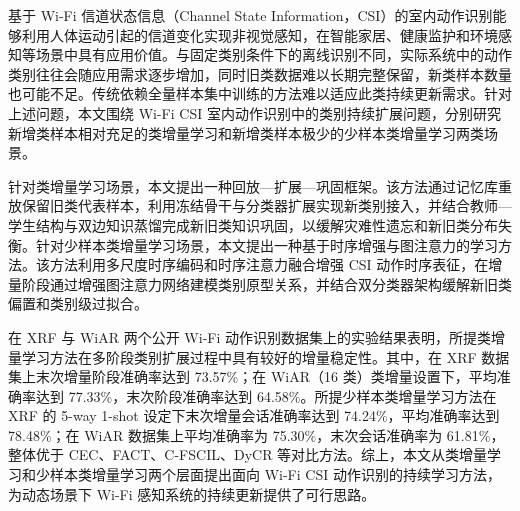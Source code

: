 
\begin{chineseabstract}

基于 Wi-Fi 信道状态信息（Channel State Information，CSI）的室内动作识别能够利用人体运动引起的信道变化实现非视觉感知，在智能家居、健康监护和环境感知等场景中具有应用价值。与固定类别条件下的离线识别不同，实际系统中的动作类别往往会随应用需求逐步增加，同时旧类数据难以长期完整保留，新类样本数量也可能不足。传统依赖全量样本集中训练的方法难以适应此类持续更新需求。针对上述问题，本文围绕 Wi-Fi CSI 室内动作识别中的类别持续扩展问题，分别研究新增类样本相对充足的类增量学习和新增类样本极少的少样本类增量学习两类场景。

针对类增量学习场景，本文提出一种回放—扩展—巩固框架。该方法通过记忆库重放保留旧类代表样本，利用冻结骨干与分类器扩展实现新类别接入，并结合教师—学生结构与双边知识蒸馏完成新旧类知识巩固，以缓解灾难性遗忘和新旧类分布失衡。针对少样本类增量学习场景，本文提出一种基于时序增强与图注意力的学习方法。该方法利用多尺度时序编码和时序注意力融合增强 CSI 动作时序表征，在增量阶段通过增强图注意力网络建模类别原型关系，并结合双分类器架构缓解新旧类偏置和类别级过拟合。

在 XRF 与 WiAR 两个公开 Wi-Fi 动作识别数据集上的实验结果表明，所提类增量学习方法在多阶段类别扩展过程中具有较好的增量稳定性。其中，在 XRF 数据集上末次增量阶段准确率达到 73.57\%；在 WiAR（16 类）类增量设置下，平均准确率达到 77.33\%，末次阶段准确率达到 64.58\%。所提少样本类增量学习方法在 XRF 的 5-way 1-shot 设定下末次增量会话准确率达到 74.24\%，平均准确率达到 78.48\%；在 WiAR 数据集上平均准确率为 75.30\%，末次会话准确率为 61.81\%，整体优于 CEC、FACT、C-FSCIL、DyCR 等对比方法。综上，本文从类增量学习和少样本类增量学习两个层面提出面向 Wi-Fi CSI 动作识别的持续学习方法，为动态场景下 Wi-Fi 感知系统的持续更新提供了可行思路。


\end{chineseabstract}


